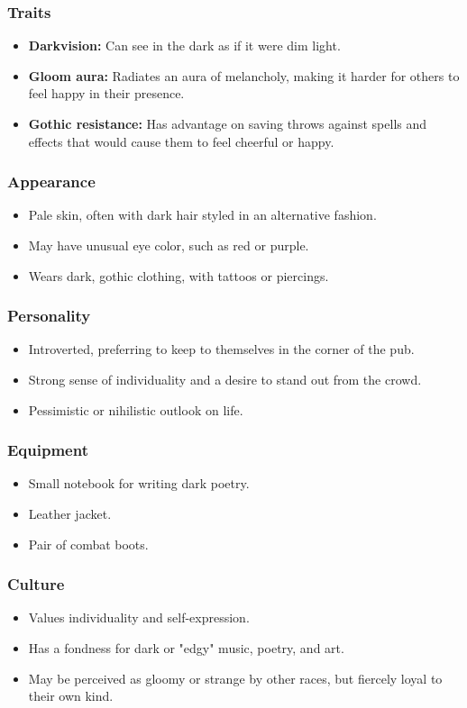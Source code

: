 \documentclass{book}
\begin{document}
\subsubsection{Traits}
\begin{itemize}
    \item \textbf{Darkvision:} Can see in the dark as if it were dim light.
    \item \textbf{Gloom aura:} Radiates an aura of melancholy, making it harder for others to feel happy in their presence.
    \item \textbf{Gothic resistance:} Has advantage on saving throws against spells and effects that would cause them to feel cheerful or happy.
\end{itemize}

\subsubsection{Appearance}
\begin{itemize}
    \item Pale skin, often with dark hair styled in an alternative fashion.
    \item May have unusual eye color, such as red or purple.
    \item Wears dark, gothic clothing, with tattoos or piercings.
\end{itemize}
\subsubsection{Personality}
\begin{itemize}
    \item Introverted, preferring to keep to themselves in the corner of the pub.
    \item Strong sense of individuality and a desire to stand out from the crowd. 
    \item Pessimistic or nihilistic outlook on life.
\end{itemize}
\subsubsection{Equipment}
\begin{itemize}
    \item Small notebook for writing dark poetry.
    \item Leather jacket.
    \item Pair of combat boots.
\end{itemize}
\subsubsection{Culture}
\begin{itemize}
    \item Values individuality and self-expression.
    \item Has a fondness for dark or "edgy" music, poetry, and art.
    \item May be perceived as gloomy or strange by other races, but fiercely loyal to their own kind.
\end{itemize}
\end{document}
